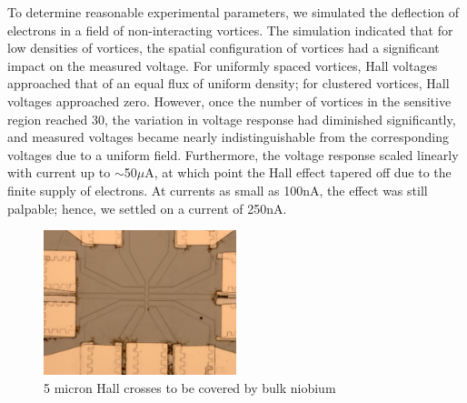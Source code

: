 \documentclass[twocolumn,aps,prl]{revtex4-1} %
\begin{document}
To determine reasonable experimental parameters, we simulated the deflection of electrons in a field of non-interacting vortices. The simulation indicated that for low densities of vortices, the spatial configuration of vortices had a significant impact on the measured voltage. For uniformly spaced vortices, Hall voltages approached that of an equal flux of uniform density; for clustered vortices, Hall voltages approached zero. However, once the number of vortices in the sensitive region reached 30, the variation in voltage response had diminished significantly, and measured voltages became nearly indistinguishable from the corresponding voltages due to a uniform field. Furthermore, the voltage response scaled linearly with current up to $\sim$50$\mu$A, at which point the Hall effect tapered off due to the finite supply of electrons. At currents as small as 100nA, the effect was still palpable; hence, we settled on a current of 250nA.

\begin{figure}
\includegraphics[width=0.5\textwidth]{4_cross_hallbar.png}
\caption{5 micron Hall crosses to be covered by bulk niobium}
\label{fig1}
\end{figure}
\end{document}

